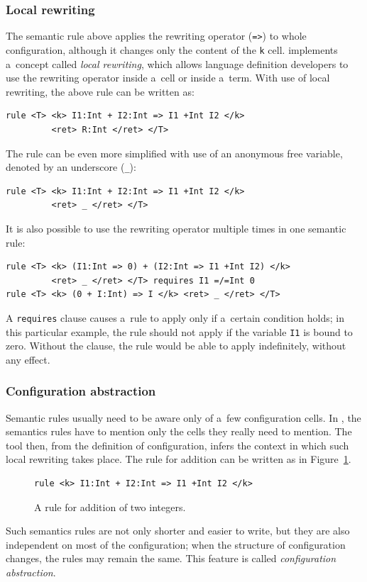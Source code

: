 \documentclass{fithesis3}
\begin{document}
\subsubsection{Local rewriting}
The semantic rule above applies the rewriting operator (\lstinline{=>}{}) to whole configuration, although it changes only the content of the \texttt{k} cell. \K implements a~concept called \textit{local rewriting}, which allows language definition developers to use the rewriting operator inside a~cell or inside a~term. With use of local rewriting, the above rule can be written as:
\begin{lstlisting}
rule <T> <k> I1:Int + I2:Int => I1 +Int I2 </k>
         <ret> R:Int </ret> </T>
\end{lstlisting}
The rule can be even more simplified with use of an anonymous free variable, denoted by an underscore (\lstinline{_}{}):
\begin{lstlisting}
rule <T> <k> I1:Int + I2:Int => I1 +Int I2 </k>
         <ret> _ </ret> </T>
\end{lstlisting}
It is also possible to use the rewriting operator multiple times in one semantic rule:
\begin{lstlisting}
rule <T> <k> (I1:Int => 0) + (I2:Int => I1 +Int I2) </k>
         <ret> _ </ret> </T> requires I1 =/=Int 0
rule <T> <k> (0 + I:Int) => I </k> <ret> _ </ret> </T>
\end{lstlisting}
A \texttt{requires} clause causes a~rule to apply only if a~certain condition holds; in this particular example, the rule should not apply if the variable \texttt{I1} is bound to zero. Without the clause, the rule would be able to apply indefinitely, without any effect.

 
\subsubsection{Configuration abstraction}

Semantic rules usually need to be aware only of a~few configuration cells. In \K, the semantics rules have to mention only the cells they really need to mention. The \K tool then, from the definition of configuration, infers the context in which such local rewriting takes place. The rule for addition can be written as in Figure~\ref{ruleAddInKCell}.
\begin{figure}
\begin{lstlisting}
rule <k> I1:Int + I2:Int => I1 +Int I2 </k>
\end{lstlisting}
\caption{A rule for addition of two integers.}
\label{ruleAddInKCell}
\end{figure}
Such semantics rules are not only shorter and easier to write, but they are also independent on most of the configuration; when the structure of configuration changes, the rules may remain the same. This feature is called \textit{configuration abstraction}.
\end{document}
